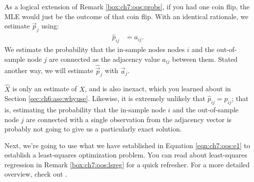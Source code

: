 As a logical extension of Remark \ref{box:ch7:oos:probs}, if you had one coin flip, the MLE would just be the outcome of that coin flip. With an identical rationale, we estimate $\vec p_j$ using:
\begin{align*}
    \hat p_{ij} &= a_{ij}.
\end{align*}
We estimate the probability that the in-sample nodes nodes $i$ and the out-of-sample node $j$ are connected as the adjacency value $a_{ij}$ between them. Stated another way, we will estimate $\hat{\vec p}_j$ with $\vec a_j$.

$\hat X$ is only an estimate of $X$, and is also inexact, which you learned about in Section \ref{sec:ch6:ase:whyuse}. Likewise, it is extremely unlikely that $\hat p_{ij} = p_{ij}$; that is, estimating the probability that the in-sample node $i$ and the out-of-sample node $j$ are connected with a single observation from the adjacency vector is probably not going to give us a particularly exact solution.  

Next, we're going to use what we have established in Equation \eqref{eqn:ch7:oos:e1} to establish a least-squares optimization problem. You can read about least-squares regression in Remark \ref{box:ch7:oos:lsreg} for a quick refresher. For a more detailed overview, check out \cite{Geron2017Mar}.

